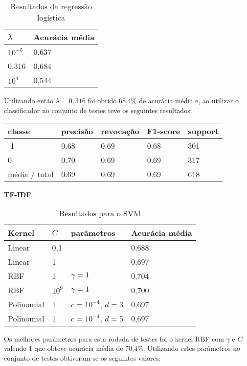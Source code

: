 \begin{table}[H]
	\centering
	\caption{Resultados da regressão logística}
	\begin{tabular}{l l}
		\hline
		$\lambda$ & Acurácia média \\
		\hline
		$10^{-5}$ & 0,637 \\
		\hline
		0,316 & 0,684 \\
		\hline
		$10^{4}$ & 0,544 \\
	\end{tabular}
\end{table}

Utilizando então $\lambda = 0,316$ foi obtido 68,4\% de acurácia média e, ao utilizar
o classificador no conjunto de testes teve os seguintes resultados:

\begin{table}[H]
	\centering
		\begin{tabular}{l | l | l | l | l}
		\hline
		classe  	&	precisão  &  revocação &  F1-score &  support \\
		\hline
		 -1    &   0.68   &   0.69   &   0.68   &    301 \\
		 \hline
          0    &   0.70   &   0.69   &   0.69   &    317 \\
		\hline
		média / total   &    0.69   &   0.69   &   0.69   &    618 \\
		\hline
	\end{tabular}
\end{table}

\textbf{TF-IDF}

\begin{table}[H]
	\centering
	\caption{Resultados para o SVM}
	\begin{tabular}{l l l l}
		\hline
		Kernel & $C$ & parâmetros & Acurácia média \\
		\hline
		Linear & 0,1 & & 0,688 \\
		\hline
		Linear & 1 & & 0,697 \\
		\hline
		RBF & 1 & $\gamma = 1$ & 0,704 \\
		\hline
		RBF & $10^{9}$ & $\gamma = 1$ & 0,700 \\
		\hline
		Polinomial & 1 & $c = 10^{-4}$, $d = 3$ & 0,697 \\
		\hline
		Polinomial & 1 & $c = 10^{-4}$, $d = 5$ & 0,697 \\
		\hline
	\end{tabular}
\end{table}

Os melhores parâmetros para esta rodada de testes foi o kernel RBF com $\gamma$ e $C$ valendo 1 que
obteve acurácia média de 70,4\%. Utilizando estes parâmetros no conjunto de testes obtiveram-se os
seguintes valores:

